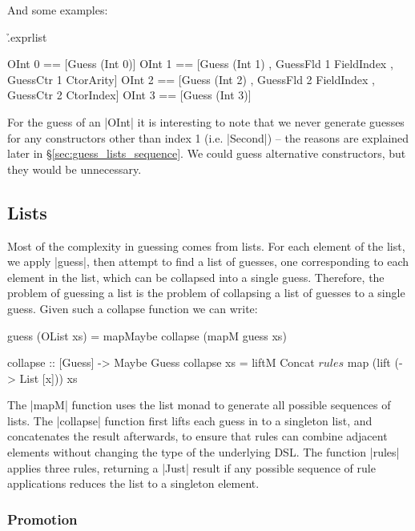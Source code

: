 \documentclass[preprint,draft]{sigplanconf}
\begin{document}
\noindent And some examples:

\h{.exprlist}\begin{code}
OInt 0 == [Guess (Int 0)]
OInt 1 == [Guess (Int 1)  , GuessFld 1 FieldIndex
                          , GuessCtr 1 CtorArity]
OInt 2 == [Guess (Int 2)  , GuessFld 2 FieldIndex
                          , GuessCtr 2 CtorIndex]
OInt 3 == [Guess (Int 3)]
\end{code}

For the guess of an |OInt| it is interesting to note that we never generate guesses for any constructors other than index 1 (i.e. |Second|) -- the reasons are explained later in \S\ref{sec:guess_lists_sequence}. We could guess alternative constructors, but they would be unnecessary.

\subsection{Lists}

Most of the complexity in guessing comes from lists. For each element of the list, we apply |guess|, then attempt to find a list of guesses, one corresponding to each element in the list, which can be collapsed into a single guess. Therefore, the problem of guessing a list is the problem of collapsing a list of guesses to a single guess. Given such a collapse function we can write:

\begin{code}
guess (OList xs) = mapMaybe collapse (mapM guess xs)

collapse :: [Guess] -> Maybe Guess
collapse xs = liftM Concat $ rules $
    map (lift (\x -> List [x])) xs
\end{code}

\begin{comment}
\begin{code}
rules :: [Guess] -> Maybe Guess
\end{code}
\end{comment}

The |mapM| function uses the list monad to generate all possible sequences of lists. The |collapse| function first lifts each guess in to a singleton list, and concatenates the result afterwards, to ensure that rules can combine adjacent elements without changing the type of the underlying DSL. The function |rules| applies three rules, returning a |Just| result if any possible sequence of rule applications reduces the list to a singleton element.

\subsubsection{Promotion}
\end{document}
